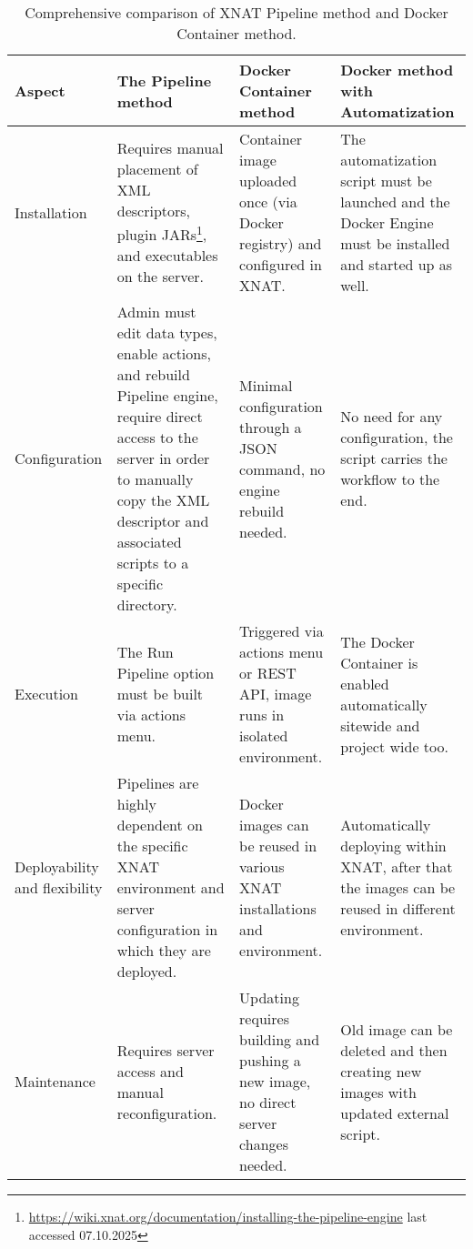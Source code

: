 \begin{table}[H]
  \centering
  \caption{Comprehensive comparison of XNAT Pipeline method and Docker Container method.}
  \label{tab:pipeline-vs-docker}

  \begin{tabular}{|>{\centering\arraybackslash}p{2cm}|
                      >{\centering\arraybackslash}p{4cm}|
                      >{\centering\arraybackslash}p{4cm}|
                      >{\centering\arraybackslash}p{4cm}|}
    \hline
    \textbf{Aspect} & \textbf{The Pipeline method} & \textbf{Docker Container method} & \textbf{Docker method with Automatization }\\ \hline
    
    
    Installation & Requires manual placement of XML descriptors, plugin JARs\footnote{\url{https://wiki.xnat.org/documentation/installing-the-pipeline-engine} last accessed 07.10.2025}, and executables on the server. & Container image uploaded once (via Docker registry) and configured in XNAT. & The automatization script must be launched and the Docker Engine must be installed and started up as well. \\ \hline
    

    
    Configuration & Admin must edit data types, enable actions, and rebuild Pipeline engine, require direct access to the server in order to manually copy the XML descriptor and associated scripts to a specific directory. & Minimal configuration through a JSON command, no engine rebuild needed. & No need for any configuration, the script carries the workflow to the end. \\ \hline
    
    Execution & The Run Pipeline option must be built via actions menu. & Triggered via actions menu or REST API, image runs in isolated environment. & The Docker Container is enabled automatically sitewide and project wide too. \\ \hline

    Deployability and flexibility & Pipelines are highly dependent on the specific XNAT environment and server configuration in which they are deployed. & Docker images can be reused in various XNAT installations and environment. & Automatically deploying within XNAT, after that the images can be reused in different environment. \\ \hline
    
    Maintenance & Requires server access and manual reconfiguration. & Updating requires building and pushing a new image, no direct server changes needed. & Old image can be deleted and then creating new images with updated external script.\\ \hline
    

\end{tabular}
\end{table}
